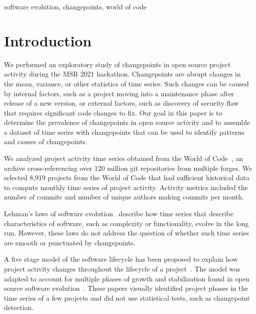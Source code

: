\documentclass[10pt,conference]{IEEEtran}
\begin{document}
\begin{IEEEkeywords}
software evolution, changepoints, world of code
\end{IEEEkeywords}

\section{Introduction}

We performed an exploratory study of changepoints in open source project activity during the MSR 2021 hackathon. Changepoints are abrupt changes in the mean, variance, or other statistics of time series. Such changes can be caused by internal factors, such as a project moving into a maintenance phase after release of a new version, or external factors, such as discovery of security flaw that requires significant code changes to fix. Our goal in this paper is to determine the prevalence of changepoints in open source activity and to assemble a dataset of time series with changepoints that can be used to identify patterns and causes of changepoints.

We analyzed project activity time series obtained from the World of Code~\cite{ma2019world}, an archive cross-referencing over 120 million git repositories from multiple forges. We selected 8,919 projects from the World of Code that had sufficient historical data to compute monthly time series of project activity. Activity metrics included the number of commits and number of unique authors making commits per month.

Lehman's laws of software evolution~\cite{lehman1996laws} describe how time series that describe characteristics of software, such as complexity or functionality, evolve in the long run. However, these laws do not address the question of whether such time series are smooth or punctuated by changepoints. 

A five stage model of the software lifecycle has been proposed to explain how project activity changes throughout the lifecycle of a project~\cite{rajlich2000staged}. The model was adapted to account for multiple phases of growth and stabilization found in open source software evolution~\cite{capiluppi2007adapting}. These papers visually identified project phases in the time series of a few projects and did not use statistical tests, such as changepoint detection.
\end{document}
